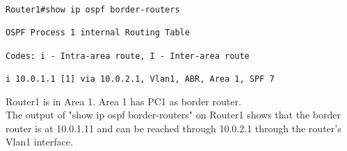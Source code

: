 \begin{lstlisting}
Router1#show ip ospf border-routers

OSPF Process 1 internal Routing Table

Codes: i - Intra-area route, I - Inter-area route

i 10.0.1.1 [1] via 10.0.2.1, Vlan1, ABR, Area 1, SPF 7
\end{lstlisting}

Router1 is in Area 1. Area 1 has PC1 as border router. \\
The output of "show ip ospf border-routers" on Router1 shows that the border router is at 10.0.1.11 and can be reached through 10.0.2.1 through the router's Vlan1 interface.
